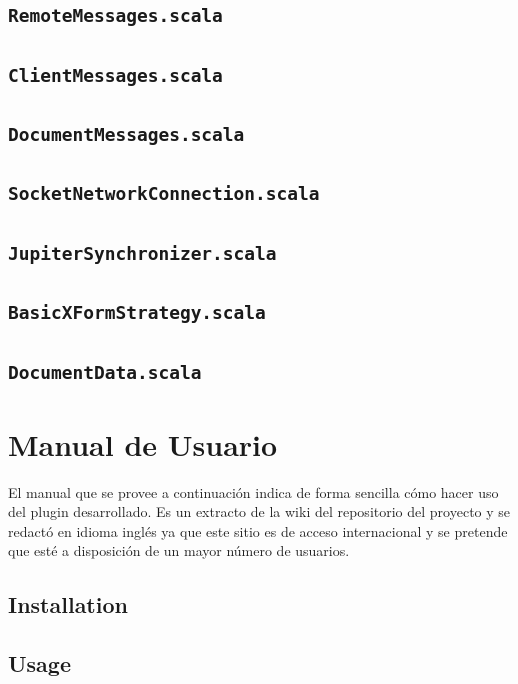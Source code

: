 \documentclass[12pt,a4paper]{article}
\let\stdsection\section
\renewcommand\section{\newpage\stdsection}
\begin{document}
\subsection{\texttt{RemoteMessages.scala}} 
\subsection{\texttt{ClientMessages.scala}} 
\subsection{\texttt{DocumentMessages.scala}} 
\subsection{\texttt{SocketNetworkConnection.scala}} 
\subsection{\texttt{JupiterSynchronizer.scala}} 
\subsection{\texttt{BasicXFormStrategy.scala}} 
\subsection{\texttt{DocumentData.scala}} 


\section{Manual de Usuario}

El manual que se provee a continuación indica de forma sencilla cómo hacer uso del plugin desarrollado. Es un extracto
de la wiki \cite{wiki-github} del repositorio del proyecto y se redactó en idioma inglés ya que este sitio es de acceso internacional
y se pretende que esté a disposición de un mayor número de usuarios.

\subsection{Installation}


\subsection{Usage}

\end{document}
